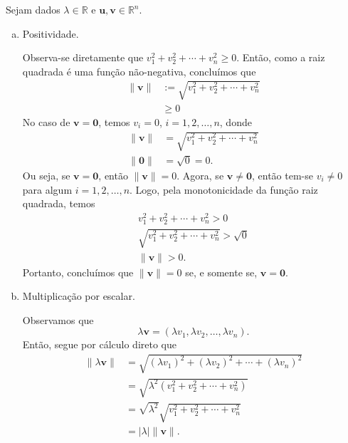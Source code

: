 \begin{dem}
  Sejam dados $\lambda\in\mathbb{R}$ e $\pmb{u},\pmb{v}\in\mathbb{R}^n$.  
  \begin{enumerate}[a)]
  \item Positividade.

    Observa-se diretamente que $v_1^2+v_2^2+\cdots + v_n^2\geq 0$. Então, como a raiz quadrada é uma função não-negativa, concluímos que
    \begin{equation}
      \begin{aligned}
        \|\pmb{v}\| &:= \sqrt{v_1^2+v_2^2+\cdots + v_n^2}\\
        &\geq 0
      \end{aligned}
    \end{equation}
    No caso de $\pmb{v} = \pmb{0}$, temos $v_i=0$, $i=1,2,\dotsc,n$, donde
    \begin{equation}
      \begin{aligned}
        \|\pmb{v}\| &= \sqrt{v_1^2+v_2^2+\cdots + v_n^2}\\
        \|\pmb{0}\| &= \sqrt{0} = 0.
      \end{aligned}
    \end{equation}
    Ou seja, se $\pmb{v} = \pmb{0}$, então $\|\pmb{v}\| = 0$. Agora, se $\pmb{v}\neq \pmb{0}$, então tem-se $v_i\neq 0$ para algum $i=1, 2, \dotsc, n$. Logo, pela monotonicidade da função raiz quadrada, temos
      \begin{gather}
        v_1^2+v_2^2+\cdots + v_n^2 > 0\\
        \sqrt{v_1^2+v_2^2+\cdots + v_n^2} > \sqrt{0}\\
        \|\pmb{v}\| > 0.
      \end{gather}
      Portanto, concluímos que $\|\pmb{v}\| = 0$ se, e somente se, $\pmb{v} = \pmb{0}$.
      
    \item Multiplicação por escalar.
      
    Observamos que
    \begin{equation}
      \lambda\pmb{v} = (\lambda v_1, \lambda v_2, \dotsc, \lambda v_n).
    \end{equation}
    Então, segue por cálculo direto que
    \begin{align}
      \|\lambda\pmb{v}\| &= \sqrt{(\lambda v_1)^2 + (\lambda v_2)^2 + \cdots + (\lambda v_n)^2}\\
                         &= \sqrt{\lambda^2(v_1^2 + v_2^2 + \cdots + v_n^2)}\\
                         &= \sqrt{\lambda^2}\sqrt{v_1^2 + v_2^2 + \cdots + v_n^2}\\
                         &= |\lambda|\|\pmb{v}\|.
    \end{align}


\end{enumerate}
\end{dem}
